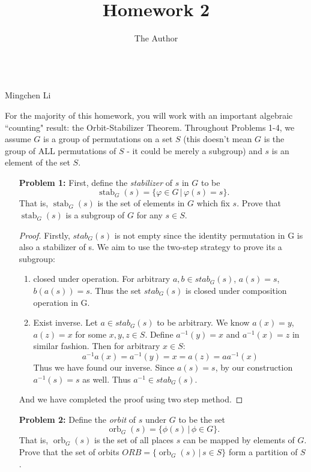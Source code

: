 \documentclass[11pt, oneside]{article}
\title{Homework 2}
\author{The Author}
\newcommand{\stab}{\operatorname{stab}}
\newcommand{\orb}{\operatorname{orb}}
\begin{document}
\begin{center}\\Mingchen Li\\ \end{center}
\thispagestyle{empty}
\hrulefill %


For the majority of this homework, you will work with an important algebraic ``counting" result: the Orbit-Stabilizer Theorem. Throughout Problems 1-4, we assume $G$ is a group of permutations on a set $S$ (this doesn't mean $G$ is the group of ALL permutations of $S$ - it could be merely a subgroup) and $s$ is an element of the set $S$. 

\begin{enumerate}

\item[{\bf Problem 1:}] First, define the {\it stabilizer} of $s$ in $G$ to be $$\stab_G(s)=\{\varphi \in G\,|\, \varphi(s) = s\}.$$ That is, $\stab_G(s)$ is the set of elements in $G$ which fix $s$. Prove that $\stab_G(s)$ is a subgroup of $G$ for any $s\in S$.
\begin{proof}
Firstly, $stab_G(s)$ is not empty since the identity permutation in G is also a stabilizer of s. We aim to use the two-step strategy to prove its a subgroup: \begin{enumerate}
    \item closed under operation. For arbitrary $a,b\in stab_G(s)$, $a(s)=s$, $b(a(s))=s$.  Thus the set $stab_G(s)$ is closed under  composition operation in G. 
    \item Exist inverse. Let $a\in stab_G(s)$ to be arbitrary. We know $a(x)=y$, $a(z)=x$ for some $x,y,z \in S$. Define $a^{-1}(y)=x$ and $a^{-1}(x)=z$ in similar fashion. Then for arbitrary $x\in S$: \[a^{-1}a(x)=a^{-1}(y)=x= a(z)= aa^{-1}(x)\]
    Thus we have found our inverse. Since $a(s)=s$, by our construction $a^{-1}(s)=s$ as well. Thus $a^{-1}\in stab_G(s)$.
    
\end{enumerate}
And we have completed the proof using two step method.
\end{proof}
\newpage
\item[{\bf Problem 2:}] Define the {\it orbit} of $s$ under $G$ to be the set $$\orb_G(s) = \{\phi(s)\,|\,\phi\in G\}.$$ That is, $\orb_G(s)$ is the set of all places $s$ can be mapped by elements of $G$.  Prove that the set of orbits $ORB = \{\orb_G(s)\,|\, s\in S\}$ form a partition of $S$.


\end{enumerate}
\end{document}
